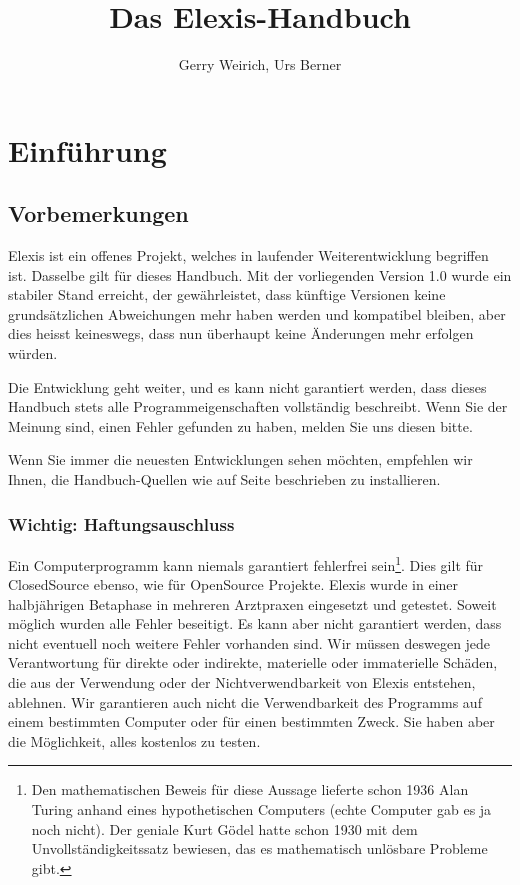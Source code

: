 \documentclass[a4paper,BCOR8.25mm,twoside]{scrbook}
\author{Gerry Weirich, Urs Berner}
\title{Das Elexis-Handbuch}
\begin{document}
\maketitle
%
\tableofcontents
\part{Einführung}
\chapter{Vorbemerkungen}
Elexis ist ein offenes Projekt, welches in laufender Weiterentwicklung begriffen ist. Dasselbe gilt für dieses Handbuch. Mit der vorliegenden Version 1.0 wurde ein stabiler Stand erreicht, der gewährleistet, dass künftige Versionen keine grundsätzlichen Abweichungen mehr haben werden und kompatibel bleiben, aber dies heisst keineswegs, dass nun überhaupt keine Änderungen mehr erfolgen würden.

Die Entwicklung geht weiter, und es kann nicht garantiert werden, dass dieses Handbuch stets alle Programmeigenschaften vollständig beschreibt. Wenn Sie der Meinung sind, einen Fehler gefunden zu haben, melden Sie uns diesen bitte.

Wenn Sie immer die neuesten Entwicklungen sehen möchten, empfehlen wir Ihnen,
die Handbuch-Quellen wie auf Seite \pageref{dokumentation} beschrieben zu
installieren.
\bigskip
\section{Wichtig: Haftungsauschluss}
Ein Computerprogramm kann niemals garantiert fehlerfrei sein\footnote{Den mathematischen Beweis für diese Aussage lieferte schon 1936 Alan Turing anhand eines hypothetischen Computers (echte Computer gab es ja noch nicht). Der geniale Kurt Gödel hatte schon 1930 mit dem Unvollständigkeitssatz bewiesen, das es mathematisch unlösbare Probleme gibt.}. Dies gilt für ClosedSource ebenso, wie für OpenSource Projekte. Elexis wurde in einer halbjährigen Betaphase in mehreren Arztpraxen eingesetzt und getestet. Soweit möglich wurden alle Fehler beseitigt. Es kann aber nicht garantiert werden, dass nicht eventuell noch weitere Fehler vorhanden sind. Wir müssen deswegen jede Verantwortung für direkte oder indirekte, materielle oder immaterielle Schäden, die aus der Verwendung oder der Nichtverwendbarkeit von Elexis entstehen, ablehnen. Wir garantieren auch nicht die Verwendbarkeit des Programms auf einem bestimmten Computer oder für einen bestimmten Zweck. Sie haben aber die Möglichkeit, alles kostenlos zu testen.
\end{document}

